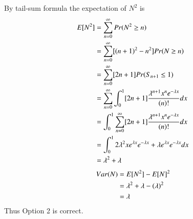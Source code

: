 \documentclass[journal,12pt,twocolumn]{IEEEtran}
\begin{document}
By tail-sum formula the expectation of $N^2$ is\\
\begin{align}
    E[ N^2 ] &= \sum _{n = 0} ^\infty Pr(N^2 \geq n)\\
    &= \sum _{n = 0} ^\infty [(n+1)^2 - n^2] Pr(N \geq n)\\
    &= \sum _{n = 0} ^\infty [2n + 1] Pr(S_{n+1} \leq 1)\\
    &=  \sum _{n = 0} ^\infty \int _0 ^1 [2n+1] \frac{\lambda^{n+1} x^{n}e^{-\lambda x}}{(n)!} dx\\
    &= \int _0 ^1 \sum _{n = 0} ^\infty [2n+1]\frac{\lambda^{n+1} x^{n}e^{-\lambda x}}{(n)!} dx\\
    &= \int _0 ^1 2\lambda^2 x e^{\lambda x} e^{-\lambda x} + \lambda e^{\lambda x} e^{-\lambda x} dx\\
    &= \lambda ^2 + \lambda
\end{align}
\begin{align}
    Var(N) &= E[ N^2 ] - E[ N ]^2\\
    &= \lambda^2 + \lambda - (\lambda)^2\\
    &= \lambda
\end{align}
Thus Option 2 is correct.
\end{document}
